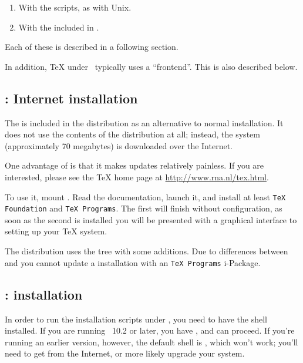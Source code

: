 \documentclass{article}
\begin{document}
\begin{enumerate}
\item With the  scripts, as with Unix.
\item With the  included in
.
\end{enumerate}

\noindent Each of these is described in a following section.

In addition, \TeX{} under \MacOSX\ typically uses a ``frontend''.  This
is also described below.


\subsection{\protect{}: Internet installation}
\label{sec:i-Installer}

The  is included in the \TL{} distribution as
an alternative to normal installation.  It does not use the contents of
the \TL{} distribution at all; instead, the system (approximately
70 megabytes) is downloaded over the Internet.

One advantage of  is that it makes updates
relatively painless.  If you are interested, please see the
 \TeX{} home page at \url{http://www.rna.nl/tex.html}.

To use it, mount .  Read the documentation,
launch it, and install at least \texttt{TeX Foundation} and \texttt{TeX
Programs}.  The first will finish without configuration, as soon as the
second is installed you will be presented with a graphical interface to
setting up your \TeX{} system.

The  distribution uses the \teTeX{} 
tree with some additions.  Due to differences between \TL{} and
\teTeX{} you cannot update a \TL{} installation with an
 \texttt{TeX Programs} i-Package.


\subsection{\protect{}: \protect\TL{} installation}

In order to run the installation scripts under \MacOSX, you need to have
the  shell installed.  If you are running \MacOSX~10.2
or later, you have , and can proceed.  If you're running
an earlier \MacOSX{} version, however, the default shell is
, which won't work; you'll need to get  from
the Internet, or more likely upgrade your system.
\end{document}
